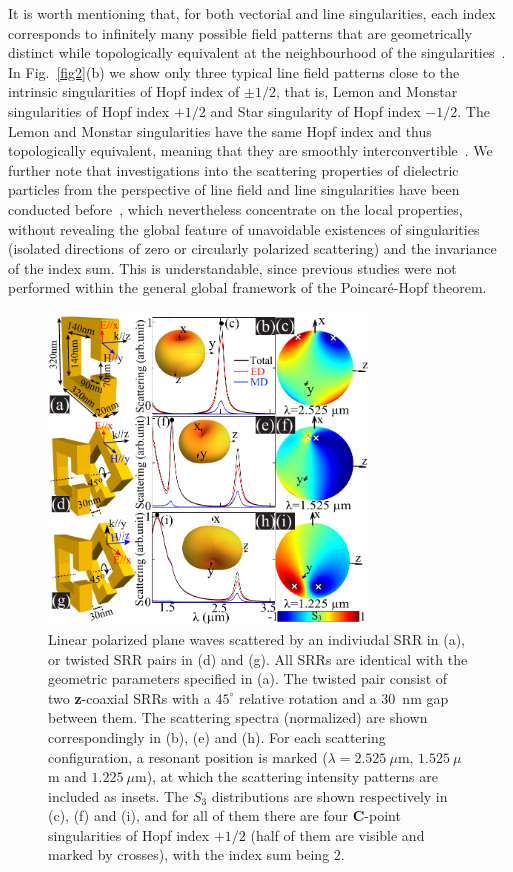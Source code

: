 \documentclass[aps,twocolumn,superscriptaddress]{revtex4-1}
\newcounter{Fig}
\begin{document}
It is worth mentioning that, for both vectorial and line singularities, each index corresponds to infinitely many possible field patterns that are geometrically distinct while topologically equivalent at the neighbourhood of the singularities~\cite{NYE_natural_1999,GBUR_2016__Singular,GALVEZ_2014_Phys.Rev.A_Generation}. In Fig.~\ref{fig2}(b) we show only three typical line field patterns close to the intrinsic singularities of Hopf index of $\pm 1/2$, that is, Lemon and Monstar singularities of Hopf index $+1/2$ and Star singularity of Hopf index $-1/2$. The Lemon and Monstar singularities have the same Hopf index and thus topologically equivalent, meaning that they are smoothly interconvertible~\cite{GALVEZ_2014_Phys.Rev.A_Generation,KUMAR_2015_ComplexLightOpt.ForcesIX_Monstar}. We further note that investigations into the scattering properties of dielectric particles from the perspective of line field and line singularities have been conducted before~\cite{GARCIA-ETXARRI_2017_ACSPhotonics_Opticala}, which nevertheless concentrate on the local properties, without revealing the global feature of unavoidable existences of singularities (isolated directions of zero or circularly polarized scattering) and the invariance of the index sum. This is understandable, since previous studies were not performed within the general global framework of the Poincar\'{e}-Hopf theorem.

%
\begin{figure}[tp]
\centerline{\includegraphics[width=8.5cm]{figure3}} \caption{\small Linear polarized plane waves scattered by an indiviudal SRR in (a), or twisted SRR pairs in (d) and (g). All SRRs are identical with the geometric parameters specified in (a).  The twisted pair consist of two \textbf{z}-coaxial SRRs with a $45^\circ$ relative rotation and a $30$~nm gap between them. The scattering spectra (normalized) are shown correspondingly in (b), (e) and (h). For each scattering configuration, a resonant position is marked ($\lambda=2.525~\mu$m, $1.525~\mu$m and $1.225~\mu$m), at which the scattering intensity patterns are included as insets. The $S_3$ distributions are shown respectively in (c), (f) and (i), and for all of them there are four \textbf{C}-point singularities of Hopf index $+1/2$ (half of them are visible and marked by crosses), with the index sum being $2$.}\label{fig3}
\end{figure}
%
\end{document}
